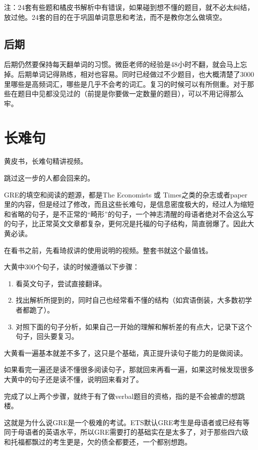 \documentclass[cn,plain]{./src/qyxfbook}
\newenvironment{material}{\begin{tcolorbox}[title={材料}]}{\end{tcolorbox}}
\begin{document}
注：24套有些题和橘皮书解析中有错误，如果碰到想不懂的题目，就不必太纠结，放过他。24套的目的在于巩固单词意思和考法，而不是教你怎么做填空。

\subsection{后期}
后期仍然要保持每天翻单词的习惯。微臣老师的经验是48小时不翻，就会马上忘掉。后期单词记得熟练，相对也容易。同时已经做过不少题目，也大概清楚了3000里哪些是高频词汇，哪些是几乎不会考的词汇。复习的时候可以有所侧重。对于那些在题目中见都没见过的（前提是你要做一定数量的题目），可以不用记得那么牢。

\section{长难句}
\begin{material}
黄皮书，长难句精讲视频。
\end{material}

跳过这一步的人都会回来的。

GRE的填空和阅读的题源，都是The Economists 或
Times之类的杂志或者paper里的内容，但是经过了修改，而且这些长难句，是信息密度极大的，经过人为缩短和省略的句子，是不正常的``畸形''的句子，一个神志清醒的母语者绝对不会这么写的句子，比正常英文文章都复杂，更何况是托福的句子结构，简直弱爆了。因此大黄必读。

在看书之前，先看琦叔讲的使用说明的视频。整套书就这个最值钱。

大黄中300个句子，读的时候遵循以下步骤：

\begin{enumerate}
    \item 看英文句子，尝试直接翻译。
    \item 找出解析所提到的，同时自己也经常看不懂的结构（如宾语倒装，大多数初学者都跪了）。
    \item 对照下面的句子分析，如果自己一开始的理解和解析差的有点大，记录下这个句子，回头要复习。
\end{enumerate}

大黄看一遍基本就差不多了，这只是个基础，真正提升读句子能力的是做阅读。

如果看完一遍还是读不懂很多阅读句子，那就回来再看一遍，如果这时候发现很多大黄中的句子还是读不懂，说明回来看对了。

完成了以上两个步骤，就终于有了做verbal题目的资格，指的是不会被虐的想跳楼。

这就是为什么说GRE是一个极难的考试。ETS默认GRE考生是母语者或已经有等同于母语者的英语水平，所以GRE需要打的基础实在是太多了，对于那些四六级和托福都飘过的考生更是，欠的债全都要还，一个都别想跑。
\end{document}
